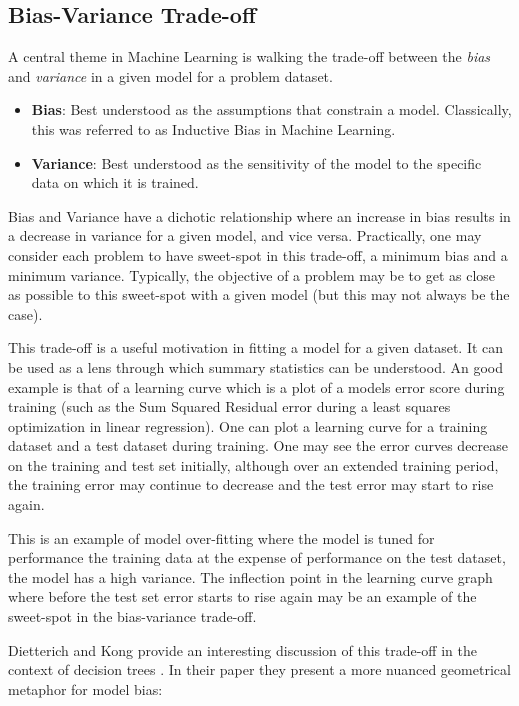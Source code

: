 \subsection{Bias-Variance Trade-off}
A central theme in Machine Learning is walking the trade-off between the \emph{bias} and \emph{variance} in a given model for a problem dataset.

\begin{itemize}
	\item \textbf{Bias}: Best understood as the assumptions that constrain a model. Classically, this was referred to as Inductive Bias in Machine Learning. 
	\item \textbf{Variance}: Best understood as the sensitivity of the model to the specific data on which it is trained.
\end{itemize}

Bias and Variance have a dichotic relationship where an increase in bias results in a decrease in variance for a given model, and vice versa. 
Practically, one may consider each problem to have sweet-spot in this trade-off, a minimum bias and a minimum variance. Typically, the objective of a problem may be to get as close as possible to this sweet-spot with a given model (but this may not always be the case). 

This trade-off is a useful motivation in fitting a model for a given dataset. It can be used as a lens through which summary statistics can be understood. An good example is that of a learning curve which is a plot of a models error score during training (such as the Sum Squared Residual error during a least squares optimization in linear regression). One can plot a learning curve for a training dataset and a test dataset during training. One may see the error curves decrease on the training and test set initially, although over an extended training period, the training error may continue to decrease and the test error may start to rise again.

This is an example of model over-fitting where the model is tuned for performance the training data at the expense of performance on the test dataset, the model has a high variance. The inflection point in the learning curve graph where before the test set error starts to rise again may be an example of the sweet-spot in the bias-variance trade-off.

Dietterich and Kong provide an interesting discussion of this trade-off in the context of decision trees \cite{Dietterich1995}. In their paper they present a more nuanced geometrical metaphor for model bias:

